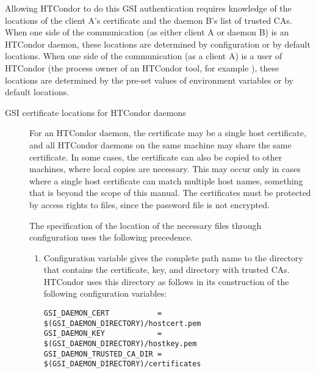 Allowing HTCondor to do this GSI authentication
requires knowledge of the locations of
the client A's certificate and the daemon B's list of
trusted CAs.
When one side of the communication (as either client A or daemon B)
is an HTCondor daemon, these locations are determined
by configuration or by default locations.
When one side of the communication (as a client A)
is a user of HTCondor (the process owner of an HTCondor tool,
for example ), these locations are determined by the
pre-set values of environment variables or by default locations.

\begin{description}
\item[GSI certificate locations for HTCondor daemons]

For an HTCondor daemon, the certificate may be a single host certificate,
and all HTCondor daemons on the same machine may share the same certificate.
In some cases, the certificate can also be copied to other machines,
where local copies are necessary.
This may occur only in cases where a single host certificate can
match multiple host names, something that is beyond the scope of this
manual. 
The certificates must be protected by access rights to files,
since the password file is not encrypted.

The specification of the location of the necessary files
through configuration uses the following precedence.
\begin{enumerate}
\item
Configuration variable  gives the complete
path name to the directory that contains the certificate, key,
and directory with trusted CAs.
HTCondor uses this directory as follows in its construction of the following
configuration variables:
\footnotesize
\begin{verbatim}
GSI_DAEMON_CERT           = $(GSI_DAEMON_DIRECTORY)/hostcert.pem
GSI_DAEMON_KEY            = $(GSI_DAEMON_DIRECTORY)/hostkey.pem 
GSI_DAEMON_TRUSTED_CA_DIR = $(GSI_DAEMON_DIRECTORY)/certificates 
\end{verbatim}


\end{enumerate}
\end{description}
